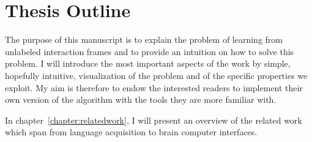 



\section{Thesis Outline}

The purpose of this manuscript is to explain the problem of learning from unlabeled interaction frames and to provide an intuition on how to solve this problem. I will introduce the most important aspects of the work by simple, hopefully intuitive, visualization of the problem and of the specific properties we exploit. My aim is therefore to endow the interested readers to implement their own version of the algorithm with the tools they are more familiar with.

In chapter~\ref{chapter:relatedwork}, I will present an overview of the related work which span from language acquisition to brain computer interfaces.

